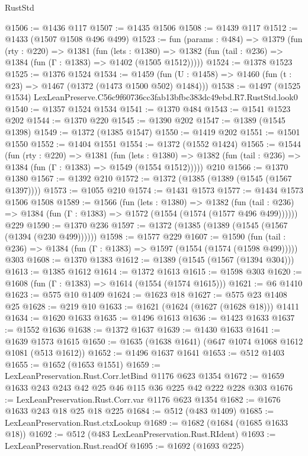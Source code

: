 \begin{lexlean}{RustStd}
\begin{coremodule}
@1506 := @1436 @117
@1507 := @1435 @1506
@1508 := @1439 @117
@1512 := @1433 (@1507 @1508 @496 @499)
@1523 := fun (params : @484) =>
  @1379
    (fun (rty : @220) =>
    @1381
      (fun (lets : @1380) =>
      @1382 (fun (tail : @236) => @1384 (fun (Γ : @1383) => @1402 (@1505 @1512)))))
@1524 := @1378 @1523
@1525 := @1376 @1524
@1534 := @1459 (fun (U : @1458) => @1460 (fun (t : @23) => @1467 (@1372 (@1473 @1500 @502) @1484)))
@1538 := @1497 (@1525 @1534) LexLeanPreserve.C56c9f60736cc3fab13bfbc383dc49ebd.R7.RustStd.look0
@1540 := @1357 @1524 @1534
@1541 := @1370 @484
@1543 := @1541 @1523 @202
@1544 := @1370 @220
@1545 := @1390 @202
@1547 := @1389 (@1545 @1398)
@1549 := @1372 (@1385 @1547)
@1550 := @1419 @202
@1551 := @1501 @1550
@1552 := @1404 @1551
@1554 := @1372 (@1552 @1424)
@1565 := @1544
    (fun (rty : @220) =>
    @1381
      (fun (lets : @1380) =>
      @1382 (fun (tail : @236) => @1384 (fun (Γ : @1383) => @1549 (@1554 @1512)))))
    @210
@1566 := @1370 @1380
@1567 := @1392 @210
@1572 := @1372 (@1385 (@1389 (@1545 (@1567 @1397))))
@1573 := @1055 @210
@1574 := @1431 @1573
@1577 := @1434 @1573 @1506 @1508
@1589 := @1566
    (fun (lets : @1380) =>
    @1382 (fun (tail : @236) => @1384 (fun (Γ : @1383) => @1572 (@1554 (@1574 (@1577 @496 @499))))))
    @229
@1590 := @1370 @236
@1597 := @1372 (@1385 (@1389 (@1545 (@1567 (@1394 (@230 @499))))))
@1598 := @1577 @229
@1607 := @1590
    (fun (tail : @236) => @1384 (fun (Γ : @1383) => @1597 (@1554 (@1574 (@1598 @499)))))
    @303
@1608 := @1370 @1383
@1612 := @1389 (@1545 (@1567 (@1394 @304)))
@1613 := @1385 @1612
@1614 := @1372 @1613
@1615 := @1598 @303
@1620 := @1608 (fun (Γ : @1383) => @1614 (@1554 (@1574 @1615)))
@1621 := @6 @1410
@1623 := @575 @10 @1409
@1624 := @1623 @18
@1627 := @575 @23 @1408 @25
@1628 := @219 @10
@1633 := @1621 (@1624 (@1627 (@1628 @18))) @1411
@1634 := @1620 @1633
@1635 := @1496 @1613
@1636 := @1423 @1633
@1637 := @1552 @1636
@1638 := @1372 @1637
@1639 := @1430 @1633
@1641 := @1639 @1573 @1615
@1650 := @1635 (@1638 @1641) (@647 @1074 @1068 @1612 @1081 (@513 @1612))
@1652 := @1496 @1637 @1641
@1653 := @512 @1403
@1655 := @1652 (@1653 @1551)
@1659 := LexLeanPreservation.Rust.Corr.letBind @1176 @623 @1354
@1672 := @1659 @1633 @243 @243 @42 @25 @46 @115 @36 @225 @42 @222 @228 @303
@1676 := LexLeanPreservation.Rust.Corr.var @1176 @623 @1354
@1682 := @1676 @1633 @243 @18 @25 @18 @225
@1684 := @512 (@483 @1409)
@1685 := LexLeanPreservation.Rust.ctxLookup
@1689 := @1682 (@1684 (@1685 @1633 @18))
@1692 := @512 (@483 LexLeanPreservation.Rust.RIdent)
@1693 := LexLeanPreservation.Rust.readOf
@1695 := @1692 (@1693 @225)

\end{coremodule}
\end{lexlean}
